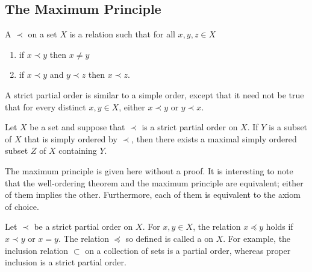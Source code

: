 \subsection{The Maximum Principle}

A  $\prec$ on a set $X$ is a relation such that for all $x, y, z \in X$
\begin{enumerate}
\item if $x \prec y$ then $x \neq y$
\item if $x \prec y$ and $y \prec z$ then $x \prec z$.
\end{enumerate}

A strict partial order is similar to a simple order, except that it need not be true that for every distinct $x, y \in X$, either $x \prec y$ or $y \prec x$.

\begin{fact}
Let $X$ be a set and suppose that $\prec$ is a strict partial order on $X$.
If $Y$ is a subset of $X$ that is simply ordered by $\prec$, then there exists a maximal simply ordered subset $Z$ of $X$ containing $Y$.
\end{fact}

The maximum principle is given here without a proof.
It is interesting to note that the well-ordering theorem and the maximum principle are equivalent; either of them implies the other.
Furthermore, each of them is equivalent to the axiom of choice.

Let $\prec$ be a strict partial order on $X$.
For $x, y \in X$, the relation $x \preceq y$ holds if $x \prec y$ or $x = y$.
The relation $\preceq$ so defined is called a  on $X$.
For example, the inclusion relation $\subset$ on a collection of sets is a partial order, whereas proper inclusion is a strict partial order.

